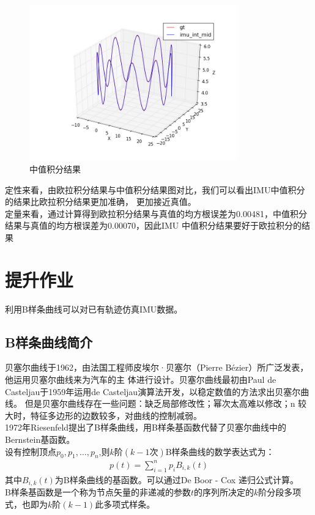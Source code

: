 \documentclass[UTF8]{ctexart}
\begin{document}
\begin{figure}[H]
\centering
\includegraphics[width=0.8\textwidth]{mid.jpg}    
\caption{中值积分结果}
\label{img1}
\end{figure}
\indent 定性来看，由欧拉积分结果与中值积分结果图对比，我们可以看出IMU中值积分的结果比欧拉积分结果更加准确，
更加接近真值。\\
\indent 定量来看，通过计算得到欧拉积分结果与真值的均方根误差为0.00481，中值积分结果与真值的均方根误差为0.00070，因此IMU
中值积分结果要好于欧拉积分的结果

\newpage
\section{提升作业}
\indent 利用B样条曲线可以对已有轨迹仿真IMU数据。\\
\subsection{B样条曲线简介}
\indent 贝塞尔曲线于1962，由法国工程师皮埃尔·贝塞尔（Pierre Bézier）所广泛发表，他运用贝塞尔曲线来为汽车的主
体进行设计。贝塞尔曲线最初由Paul de Casteljau于1959年运用de Casteljau演算法开发，以稳定数值的方法求出贝塞尔曲线。
但是贝塞尔曲线存在一些问题：缺乏局部修改性；幂次太高难以修改；n 较大时，特征多边形的边数较多，对曲线的控制减弱。\\
\indent 1972年Riesenfeld提出了B样条曲线，用B样条基函数代替了贝塞尔曲线中的Bernstein基函数。\\
\indent 设有控制顶点$p_0,p_1,…,p_n$,则$k$阶$(k-1次)$B样条曲线的数学表达式为：\\
\begin{equation}
\begin{aligned}
p(t)=\sum_{i=1}^np_iB_{i,k}(t)
\end{aligned}
\end{equation}
\indent 其中$B_{i,k}(t)$为B样条曲线的基函数。可以通过De Boor - Cox 递归公式计算。\\
\indent B样条基函数是一个称为节点矢量的非递减的参数$t$的序列所决定的$k$阶分段多项式，也即为$k$阶$(k-1)$此多项式样条。\\
\end{document}
